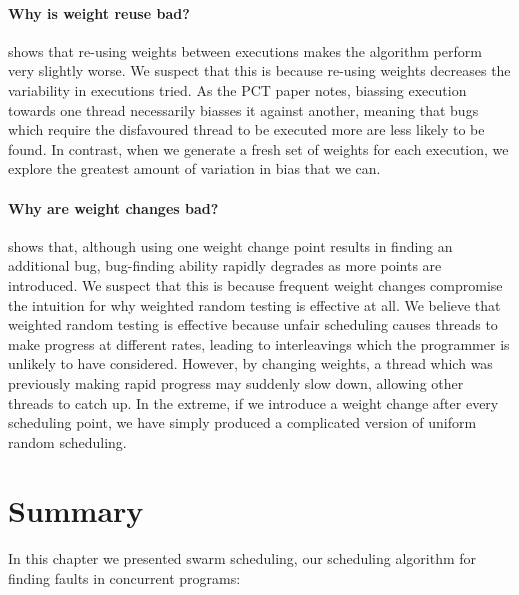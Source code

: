 \paragraph{Why is weight reuse bad?}
 shows that re-using weights between executions
makes the algorithm perform very slightly worse.  We suspect that this
is because re-using weights decreases the variability in executions
tried.  As the PCT paper notes, biassing execution towards one thread
necessarily biasses it against another, meaning that bugs which
require the disfavoured thread to be executed more are less likely to
be found\cite{burckhardt2010}.  In contrast, when we generate a fresh
set of weights for each execution, we explore the greatest amount of
variation in bias that we can.

\paragraph{Why are weight changes bad?}
 shows that, although using one weight change
point results in finding an additional bug, bug-finding ability
rapidly degrades as more points are introduced.  We suspect that this
is because frequent weight changes compromise the intuition for why
weighted random testing is effective at all.  We believe that weighted
random testing is effective because unfair scheduling causes threads
to make progress at different rates, leading to interleavings which
the programmer is unlikely to have considered.  However, by changing
weights, a thread which was previously making rapid progress may
suddenly slow down, allowing other threads to catch up.  In the
extreme, if we introduce a weight change after every scheduling point,
we have simply produced a complicated version of uniform random
scheduling.

\vfill\pagebreak
\section{Summary}

In this chapter we presented swarm scheduling, our scheduling
algorithm for finding faults in concurrent programs:

